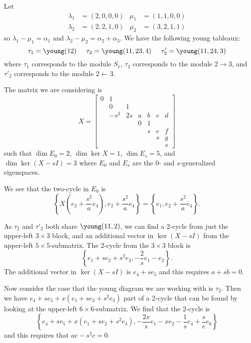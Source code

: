 \documentclass{article}
\begin{document}
\begin{example}[Roger]
Let
    \[
    \begin{aligned}
        \lambda_1 &= (2,0,0,0) & \mu_1 &= (1,1,0,0) \\
        \lambda_2 &= (2,2,1,0) & \mu_2 &= (3,2,1,1)
    \end{aligned}
    \]
so $\lambda_1 - \mu_1 = \alpha_1$ and $\lambda_2 - \mu_2 = \alpha_2 + \alpha_3$. We have the following young tableaux:
\[
\tau_1 = \young(12) \hspace{5mm}
\tau_2 = \young(11,23,4) \hspace{5mm}
\tau_2' = \young(11,24,3)
\]
where $\tau_1$ corresponds to the module $S_1$, $\tau_2$ corresponds to the module $2\rightarrow 3$, and $\tau'_2$ corresponds to the module $2 \leftarrow 3$.

The matrix we are considering is 
\[
X = \begin{bmatrix}
    0 & 1 \\
     & 0 & 1 \\
     & -s^2 & 2s & a & b & c & d \\
     & & & 0 & 1 \\
     & & & & s & e & f \\
     & & & & & s & g \\
     & & & & & & s
\end{bmatrix}
\]
such that $\dim E_0 = 2$, $\dim \ker X = 1$, $\dim E_s = 5$, and $\dim \ker (X-sI) = 3$ where $E_0$ and $E_s$ are the $0$- and $s$-generalized eigenspaces.

We see that the two-cycle in $E_0$ is 
\[
\left\{ X\left(e_2 + \frac{s^2}{a}e_4\right), e_2 + \frac{s^2}{a}e_4 \right\}
= \left\{e_1, e_2 + \frac{s^2}{a}e_4 \right\}.
\]

As $\tau_2$ and $\tau'_2$ both share $\young(11,2)$, we can find a 2-cycle from just the upper-left $3\times3$ block, and an additional vector in $\ker(X-sI)$ from the upper-left $5\times5$-submatrix. The 2-cycle from the $3 \times 3$ block is
\[
\left\{e_1 + se_2 + s^2e_3, -\frac{2}{s}e_1 - e_2 \right\}.
\]
The additional vector in $\ker(X-sI)$ is $e_4 + se_5$ and this requires $a+sb=0$.

Now consider the case that the young diagram we are working with is $\tau_2$. Then we have $e_4 + se_5 + x(e_1 + se_2 + s^2e_3)$ part of a 2-cycle that can be found by looking at the upper-left $6 \times 6$-submatrix. We find that the 2-cycle is
\[
\left\{e_4 + se_5 + x(e_1 + se_2 + s^2e_3), -\frac{2x}{s}e_1 -xe_2 -\frac{1}{s}e_4 + \frac{s}{e}e_6 \right\}
\]
and this requires that $ae - s^2c = 0$.


\end{example}
\end{document}
